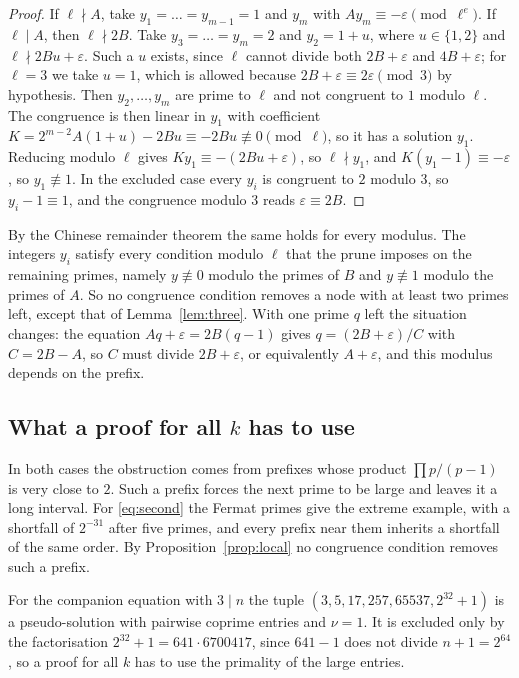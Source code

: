 \documentclass[11pt,reqno]{amsart}
\numberwithin{equation}{section}
\theoremstyle{plain}
\theoremstyle{definition}
\theoremstyle{remark}
\begin{document}
\begin{proof}
If $\ell\nmid A$, take $y_1=\dots=y_{m-1}=1$ and $y_m$ with
$Ay_m\equiv-\varepsilon\pmod{\ell^e}$. If $\ell\mid A$, then $\ell\nmid2B$. Take
$y_3=\dots=y_m=2$ and $y_2=1+u$, where $u\in\{1,2\}$ and
$\ell\nmid2Bu+\varepsilon$. Such a $u$ exists, since $\ell$ cannot divide
both $2B+\varepsilon$ and $4B+\varepsilon$; for $\ell=3$ we take $u=1$,
which is allowed because $2B+\varepsilon\equiv2\varepsilon\pmod3$ by
hypothesis. Then $y_2,\dots,y_m$ are prime to $\ell$ and not congruent to
$1$ modulo $\ell$. The congruence is then linear in
$y_1$ with coefficient $K=2^{m-2}A(1+u)-2Bu\equiv-2Bu\not\equiv0\pmod
\ell$, so it has a solution $y_1$. Reducing modulo $\ell$ gives
$Ky_1\equiv-(2Bu+\varepsilon)$, so $\ell\nmid y_1$, and
$K(y_1-1)\equiv-\varepsilon$, so $y_1\not\equiv1$. In the excluded
case every $y_i$ is congruent to $2$ modulo $3$, so $y_i-1\equiv1$,
and the congruence modulo $3$ reads $\varepsilon\equiv2B$.
\end{proof}

By the Chinese remainder theorem the same holds for every modulus. The
integers $y_i$ satisfy every condition modulo $\ell$ that the prune
imposes on the remaining primes, namely $y\not\equiv0$ modulo the primes
of $B$ and $y\not\equiv1$ modulo the primes of $A$. So no congruence
condition removes a node with at least two primes left, except that of
Lemma~\ref{lem:three}. With one prime $q$ left the situation changes:
the equation $Aq+\varepsilon=2B(q-1)$ gives $q=(2B+\varepsilon)/C$
with $C=2B-A$, so $C$ must divide $2B+\varepsilon$, or equivalently
$A+\varepsilon$, and this modulus depends on the prefix.

\subsection{What a proof for all \texorpdfstring{$k$}{k} has to use}\label{sec:allk}
In both cases the obstruction comes from prefixes whose product
$\prod p/(p-1)$ is very close to $2$. Such a prefix forces the next
prime to be large and leaves it a long interval. For \eqref{eq:second} the
Fermat primes give the extreme example, with a shortfall of $2^{-31}$
after five primes, and every prefix near them inherits a shortfall of
the same order. By Proposition~\ref{prop:local} no congruence condition
removes such a prefix.

For the companion equation with $3\mid n$ the tuple
$(3,5,17,257,65537,2^{32}+1)$ is a pseudo-solution with pairwise
coprime entries and $\nu=1$. It is excluded only by the factorisation
$2^{32}+1=641\cdot6700417$, since $641-1$ does not divide
$n+1=2^{64}$, so a proof for all $k$ has to use the primality of the
large entries.
\end{document}
